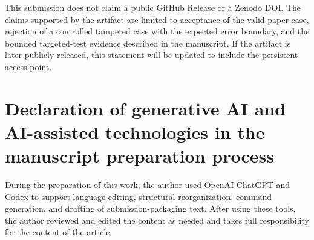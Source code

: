 \documentclass[11pt]{article}
\begin{document}
This submission does not claim a public GitHub Release or a Zenodo DOI. The
claims supported by the artifact are limited to acceptance of the valid paper
case, rejection of a controlled tampered case with the expected error
boundary, and the bounded targeted-test evidence described in the manuscript.
If the artifact is later publicly released, this statement will be updated to
include the persistent access point.

\section*{Declaration of generative AI and AI-assisted technologies in the manuscript preparation process}

During the preparation of this work, the author used OpenAI ChatGPT and Codex
to support language editing, structural reorganization, command generation,
and drafting of submission-packaging text. After using these tools, the
author reviewed and edited the content as needed and takes full responsibility
for the content of the article.
\end{document}
